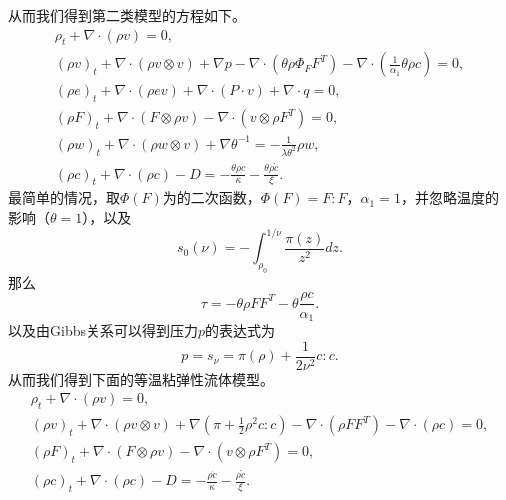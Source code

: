 \documentclass{article}
\begin{document}
从而我们得到第二类模型的方程如下。
\begin{subequations}
  \begin{align}
  \rho_t + \nabla \cdot (\rho v) = 0, \\
  (\rho v)_t + \nabla \cdot ( \rho v \otimes v) + \nabla p - \nabla \cdot (\theta \rho \Phi_F F^T) - \nabla \cdot (\frac{1}{\alpha_1}\theta \rho c) = 0, \\
  (\rho e)_t + \nabla \cdot (\rho e v) + \nabla \cdot (P \cdot v) + \nabla \cdot q = 0, \\
  (\rho F)_t + \nabla \cdot (F \otimes \rho v) - \nabla \cdot (v \otimes \rho F^T) = 0, \\
  (\rho w)_t + \nabla \cdot (\rho w \otimes v) + \nabla \theta^{-1} = -\frac{1}{\lambda \theta^2} \rho w, \\
  (\rho c)_t + \nabla \cdot (\rho c) - D  = -\frac{\theta \rho \dot{c}}{\kappa}  -\frac{\theta \rho \mathring{c}}{\xi}.
\end{align}
\end{subequations}
最简单的情况，取$\Phi(F)$为的二次函数，$\Phi(F) = F:F$，$\alpha_1=1$，并忽略温度的影响（$\theta=1$），以及
\begin{equation*}
    s_0(\nu) = -\int_{\rho_0}^{1/\nu} \frac{\pi(z)}{z^2} dz.
\end{equation*}
那么
\begin{equation*}
	\tau = -\theta \rho F F^T - \theta \frac{\rho c}{\alpha_1}.
\end{equation*}
以及由Gibbs关系可以得到压力$p$的表达式为
\begin{equation*}
    p = s_\nu = \pi(\rho) + \frac{1}{2\nu^2} c:c.
\end{equation*}
从而我们得到下面的等温粘弹性流体模型。
\begin{subequations}\label{eq:compressibleRelax}
  \begin{align}
  \rho_t + \nabla \cdot (\rho v) = 0, \\
  (\rho v)_t + \nabla \cdot ( \rho v \otimes v) + \nabla (\pi + \frac{1}{2}\rho^2c:c) - \nabla \cdot (\rho F F^T) - \nabla \cdot (\rho c) = 0, \\
    (\rho F)_t + \nabla \cdot (F \otimes \rho v) - \nabla \cdot (v \otimes \rho F^T) = 0, \\
  (\rho c)_t + \nabla \cdot (\rho c) - D  = -\frac{ \rho \dot{c}}{\kappa}  -\frac{ \rho \mathring{c}}{\xi}.
\end{align}
\end{subequations}
\end{document}

